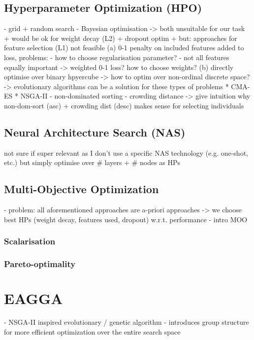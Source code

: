 \documentclass[twoside,11pt]{article}
\begin{document}
\subsection{Hyperparameter Optimization (HPO)}
- grid + random search
- Bayesian optimisation
-> both unsuitable for our task
  + would be ok for weight decay (L2) + dropout optim
  + but: approaches for feature selection (L1) not feasible
    (a) 0-1 penalty on included features added to loss, problems:
      - how to choose regularisation parameter?
      - not all features equally important -> weighted 0-1 loss? how to choose weights?
    (b) directly optimise over binary hpyercube -> how to optim over non-ordinal discrete space?
-> evolutionary algorithms can be a solution for these types of problems
  * CMA-ES
  * NSGA-II
    - non-dominated sorting
    - crowding distance
    -> give intuition why non-dom-sort (asc) + crowding dist (desc) makes sense for selecting individuals
\subsection{Neural Architecture Search (NAS)}
not sure if super relevant as I don't use a specific NAS technology (e.g. one-shot, etc.) but simply optimise over \# layers + \# nodes as HPs

\subsection{Multi-Objective Optimization}
- problem: all aforementioned approaches are a-priori approaches -> we choose best HPs (weight decay, features used, dropout) w.r.t. performance
- intro MOO
\subsubsection{Scalarisation}
\subsubsection{Pareto-optimality}


\section{EAGGA}
- NSGA-II inspired evolutionary / genetic algorithm
- introduces group structure for more efficient optimization over the entire search space
\end{document}
